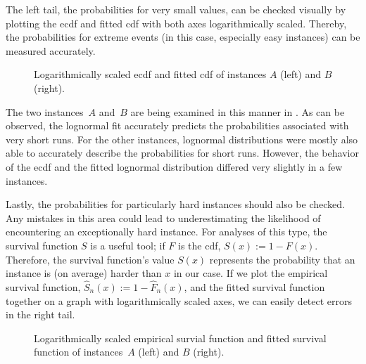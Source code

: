 The left tail, \ie the probabilities for 
very
small values, can be checked visually by plotting the ecdf and 
fitted cdf with both axes logarithmically scaled.
Thereby, the probabilities for extreme events (in this case, especially easy instances) can be measured accurately. 
\begin{figure}[htb]
	\centering
	\begin{subfigure}[t]{.465\linewidth}
		\centering
		
	\end{subfigure}%
	\hfill%
	\begin{subfigure}[t]{.465\linewidth}
		\centering
		
	\end{subfigure}%
	\caption{%
		Logarithmically scaled ecdf and fitted cdf of instances $A$ (left) and $B$ (right).
	}
	\label{fig:log_cdf-log_ecdf}
\end{figure}

The two instances~$A$ and~$B$ are being examined in this manner in . As can be observed, the lognormal fit accurately predicts the probabilities associated with very short runs. For the other instances, lognormal distributions were mostly also able to accurately describe the probabilities for short runs. However, the behavior of the ecdf and the fitted lognormal distribution differed very slightly in a few instances. 

Lastly, the probabilities for particularly hard instances should also be checked.  Any mistakes in this area could lead to underestimating the likelihood of encountering an exceptionally hard instance. For analyses of this type, the survival function $S$ is a useful tool; if $F$ is the cdf, $S(x):=1-F(x)$. Therefore, the survival function's value $S(x)$ represents the probability that an instance is (on average) harder than $x$ in our case. If we plot the empirical survival function, \ie $\hat{S}_n(x) := 1-\hat{F}_n(x)$, and the fitted survival function together on a graph with logarithmically scaled axes, we can easily detect errors in the right tail.

\begin{figure}[htb]
	\centering
	\begin{subfigure}[t]{.465\linewidth}
		\centering
		
	\end{subfigure}%
	\hfill%
	\begin{subfigure}[t]{.465\linewidth}
		\centering
		
	\end{subfigure}%
	\caption{%
		Logarithmically scaled empirical survial function and fitted survival function of instances~$A$ (left) and $B$ (right).
	}
	\label{fig:sf-esf}
\end{figure}

